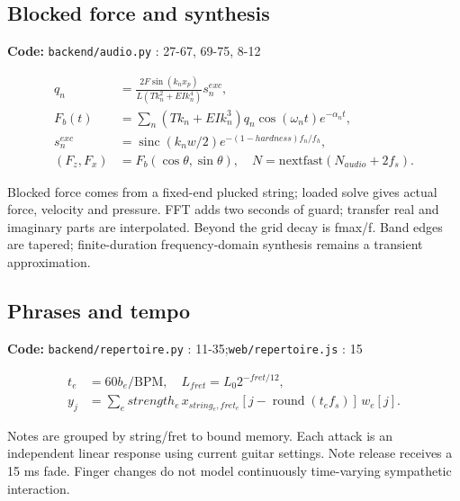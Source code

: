 \documentclass[10pt,a4paper]{article}
\newcommand{\loc}[1]{{\small\color{ink}\textbf{Code:} #1\par}}
\newcommand{\sinc}{\operatorname{sinc}}\newcommand{\clip}{\operatorname{clip}}\newcommand{\diag}{\operatorname{diag}}\newcommand{\Rea}{\operatorname{Re}}\newcommand{\rms}{\operatorname{RMS}}
\begin{document}
\begin{samepage}\subsection{Blocked force and synthesis}
\loc{\texttt{backend/audio.py} : 27-67, 69-75, 8-12}
\begin{align}q_n&=\frac{2F\sin(k_nx_p)}{L(Tk_n^2+EI k_n^4)}s_n^{exc},\\
F_b(t)&=\sum_n(Tk_n+EI k_n^3)q_n\cos(\omega_nt)e^{-\alpha_nt},\\
s_n^{exc}&=\sinc(k_nw/2)e^{-(1-hardness)f_n/f_h},\\
(F_z,F_x)&=F_b(\cos\theta,\sin\theta),\quad N=\mathrm{nextfast}(N_{audio}+2f_s).\end{align}

Blocked force comes from a fixed-end plucked string; loaded solve gives actual force, velocity and pressure. FFT adds two seconds of guard; transfer real and imaginary parts are interpolated. Beyond the grid decay is fmax/f. Band edges are tapered; finite-duration frequency-domain synthesis remains a transient approximation.\par
\end{samepage}
\begin{samepage}\subsection{Phrases and tempo}
\loc{\texttt{backend/repertoire.py} : 11-35;\allowbreak\quad \texttt{web/repertoire.js} : 15}
\begin{align}t_e&=60b_e/\mathrm{BPM},\quad L_{fret}=L_0 2^{-fret/12},\\
y_j&=\sum_e strength_e\,x_{string_e,fret_e}[j-\operatorname{round}(t_ef_s)]\,w_e[j].\end{align}

Notes are grouped by string/fret to bound memory. Each attack is an independent linear response using current guitar settings. Note release receives a 15 ms fade. Finger changes do not model continuously time-varying sympathetic interaction.\par
\end{samepage}
\end{document}
